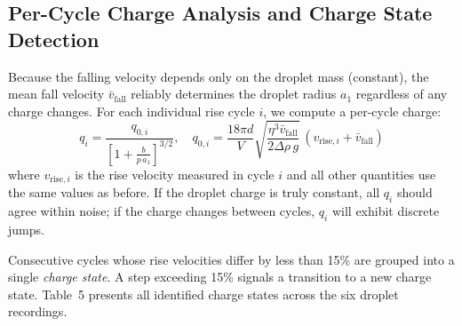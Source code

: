 \documentclass[11pt]{article}
\begin{document}
\subsection{Per-Cycle Charge Analysis and Charge State Detection}

Because the falling velocity depends only on the droplet mass (constant), the mean fall velocity $\bar{v}_{\text{fall}}$ reliably determines the droplet radius $a_1$ regardless of any charge changes. For each individual rise cycle $i$, we compute a per-cycle charge:
\begin{equation}
q_i = \frac{q_{0,i}}{\left[1 + \frac{b}{p\,a_1}\right]^{3/2}}, \quad
q_{0,i} = \frac{18\pi d}{V}\sqrt{\frac{\eta^3 \bar{v}_{\text{fall}}}{2\Delta\rho\,g}}\,(v_{\text{rise},i} + \bar{v}_{\text{fall}})
\end{equation}
where $v_{\text{rise},i}$ is the rise velocity measured in cycle $i$ and all other quantities use the same values as before. If the droplet charge is truly constant, all $q_i$ should agree within noise; if the charge changes between cycles, $q_i$ will exhibit discrete jumps.

Consecutive cycles whose rise velocities differ by less than 15\% are grouped into a single \emph{charge state}. A step exceeding 15\% signals a transition to a new charge state. Table~5 presents all identified charge states across the six droplet recordings.
\end{document}
